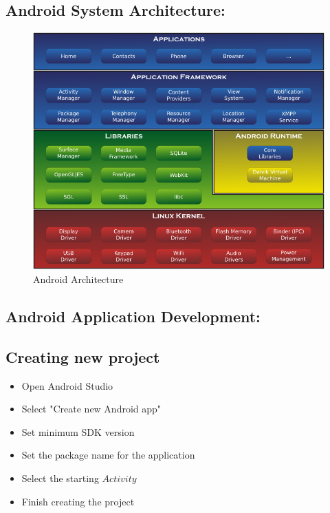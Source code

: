 \documentclass{article}
\begin{document}
\subsection{Android System Architecture:}
	\begin{figure}[h!]
		\centering
		\includegraphics[scale=0.5]{android_architecture.png}
        \caption{Android Architecture}
        \label{fig:android_arch}
	\end{figure}
\subsection{Android Application Development:}    
	\subsection {Creating new project}
    	\begin{itemize}
			\item Open Android Studio
        	\item Select "Create new Android app"
	        \item Set minimum SDK version
	        \item Set the package name for the application
	        \item Select the starting $Activity$
	        \item Finish creating the project
		\end{itemize}  
\end{document}
